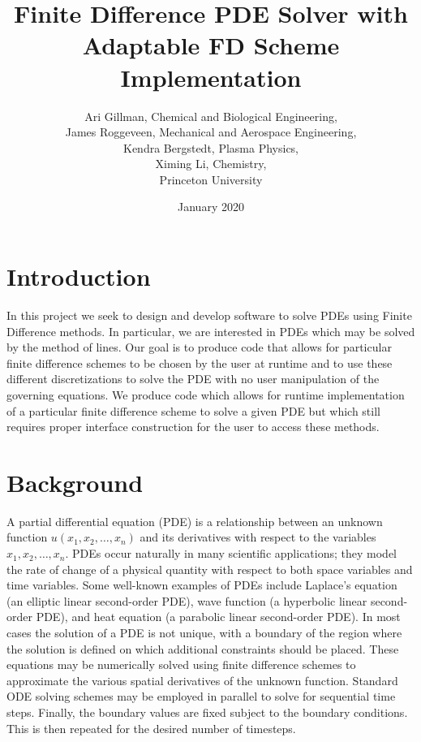 \documentclass{article}
\title{Finite Difference PDE Solver with Adaptable FD Scheme Implementation}
\author{Ari Gillman, Chemical and Biological Engineering,\\
James Roggeveen, Mechanical and Aeros{}pace Engineering,\\
Kendra Bergstedt, Plasma Physics,\\
Ximing Li, Chemistry,\\
Princeton University
}
\date{January 2020}
\begin{document}
	\maketitle
	\section{Introduction}
	In this project we seek to design and develop software to solve PDEs using Finite Difference methods. In particular, we are interested in PDEs which may be solved by the method of lines. Our goal is to produce code that allows for particular finite difference schemes to be chosen by the user at runtime and to use these different discretizations to solve the PDE with no user manipulation of the governing equations. We produce code which allows for runtime implementation of a particular finite difference scheme to solve a given PDE but which still requires proper interface construction for the user to access these methods.

	\section{Background}
	A partial differential equation (PDE) is a relationship between an unknown function $u(x_1, x_2, \ldots, x_n)$ and its derivatives with respect to the variables $x_1, x_2, \ldots , x_n$. PDEs occur naturally in many scientific applications; they model the rate of change of a physical quantity with respect to both space variables and time variables. Some well-known examples of PDEs include Laplace’s equation (an elliptic linear second-order PDE), wave function (a hyperbolic linear second-order PDE), and heat equation (a parabolic linear second-order PDE). In most cases the solution of a PDE is not unique, with a boundary of the region where the solution is defined on which additional constraints should be placed. These equations may be numerically solved using finite difference schemes to approximate the various spatial derivatives of the unknown function. Standard ODE solving schemes may be employed in parallel to solve for sequential time steps. Finally, the boundary values are fixed subject to the boundary conditions. This is then repeated for the desired number of timesteps.
\end{document}
